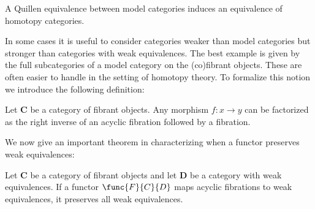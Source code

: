     \begin{property}
        A Quillen equivalence between model categories induces an equivalence of homotopy categories.
    \end{property}

    In some cases it is useful to consider categories weaker than model categories but stronger than categories with weak equivalences. The best example is given by the full subcategories of a model category on the (co)fibrant objects. These are often easier to handle in the setting of homotopy theory. To formalize this notion we introduce the following definition:

    \begin{theorem}
        Let $\mathbf{C}$ be a category of fibrant objects. Any morphism $f:x\rightarrow y$ can be factorized as the right inverse of an acyclic fibration followed by a fibration.
    \end{theorem}

    We now give an important theorem in characterizing when a functor preserves weak equivalences:
    \begin{theorem}\label{model:ken_brown}
        Let $\mathbf{C}$ be a category of fibrant objects and let $\mathbf{D}$ be a category with weak equivalences. If a functor $\func{F}{C}{D}$ maps acyclic fibrations to weak equivalences, it preserves all weak equivalences.
    \end{theorem}

